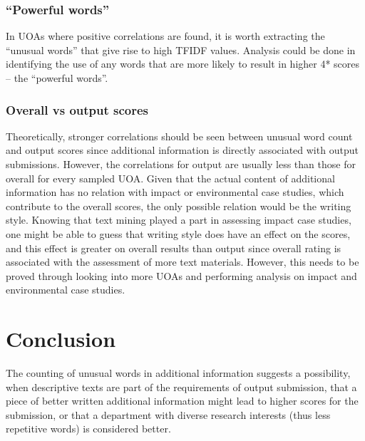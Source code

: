 \documentclass[a4paper, 11pt]{article}
\begin{document}
\noindent
\subsubsection{``Powerful words''}

\noindent
In UOAs where positive correlations are found, it is worth extracting the ``unusual words'' that give rise to high TFIDF values. Analysis could be done in identifying the use of any words that are more likely to result in higher 4* scores -- the ``powerful words''.\\

\noindent
\subsubsection{Overall vs output scores}

\noindent
Theoretically, stronger correlations should be seen between unusual word count and output scores since additional information is directly associated with output submissions. However, the correlations for output are usually less than those for overall for every sampled UOA. Given that the actual content of additional information has no relation with impact or environmental case studies, which contribute to the overall scores, the only possible relation would be the writing style. Knowing that text mining played a part in assessing impact case studies, one might be able to guess that writing style does have an effect on the scores, and this effect is greater on overall results than output since overall rating is associated with the assessment of more text materials. However, this needs to be proved through looking into more UOAs and performing analysis on impact and environmental case studies.




\section{Conclusion}

The counting of unusual words in additional information suggests a possibility, when descriptive texts are part of the requirements of output submission, that a piece of better written additional information might lead to higher scores for the submission, or that a department with diverse research interests (thus less repetitive words) is considered better. 




\renewcommand\refname{Bibliography}

\end{document}
